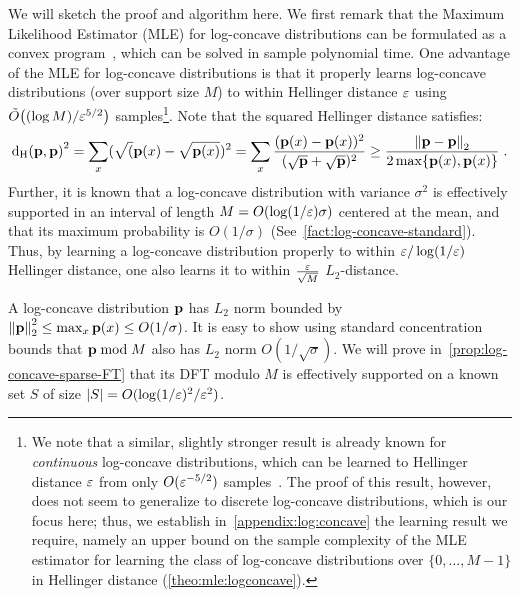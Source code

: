 We will sketch the proof and algorithm here. We first remark that the Maximum Likelihood Estimator (MLE) for log-concave distributions can be formulated as a convex program~\cite{DR:11}, 
which can be solved in sample polynomial time. One advantage of the MLE for log-concave distributions is that it properly learns log-concave distributions (over support size $M$) 
to within Hellinger distance $\varepsilon$ using $\tildeO{(\log M)/\eps^{5/2}}$ samples\footnote{We note that a similar, slightly stronger result is already known for \emph{continuous} log-concave distributions, which can be learned to Hellinger distance $\varepsilon$ from only $O(\varepsilon^{-5/2})$ samples~\cite{KS:16}. The proof of this result, however, does not seem to generalize to discrete log-concave distributions, which is our focus here; thus, we establish in~\cref{appendix:log:concave} the learning result we require, namely an upper bound on the sample complexity of the MLE estimator for learning the class of log-concave distributions over $\{0,\dots,M-1\}$ in Hellinger distance (\cref{theo:mle:logconcave}).}. Note that the squared Hellinger distance satisfies:
\[
{\operatorname{d_{\textrm{H}}}\!\left({\mathbf{p}, \mathbf{p}}\right)}^2 = \sum_x (\sqrt(\mathbf{p}(x)-\sqrt{\mathbf{p}(x)})^2 = \sum_x \frac{(\mathbf{p}(x)-\mathbf{p}(x))^2}{(\sqrt{\mathbf{p}} +\sqrt{\mathbf{p}})^2} \geq \frac{{\lVert\mathbf{p}-\mathbf{p}{\rVert}}_2}{2\max\{\mathbf{p}(x),\mathbf{p}(x)\}} \;.
\]
Further, it is known that a log-concave distribution with variance $\sigma^2$ is effectively supported in an interval of length $M=O(\log(1/\varepsilon) \sigma)$ centered at the mean, 
and that its maximum probability is $O(1/\sigma)$ (See~\cref{fact:log-concave-standard}). Thus, by learning a log-concave distribution properly to within $\varepsilon/\log(1/\varepsilon)$ Hellinger distance, one also learns it to within $\frac{\varepsilon}{\sqrt{M}}$ $L_2$-distance.

A log-concave distribution $\mathbf{p}$ has $L_2$ norm bounded by ${\lVert\mathbf{p}{\rVert}}_2^2 \leq \max_x \mathbf{p}(x) \leq O(1/\sigma)$. 
It is easy to show using standard concentration bounds that $\mathbf{p} \bmod M$ also has $L_2$ norm $O(1/\sqrt{\sigma})$. 
We will prove in~\cref{prop:log-concave-sparse-FT} that its DFT modulo $M$ is effectively 
supported on a known set $S$ of size $|S|=O(\log(1/\varepsilon)^2/\varepsilon^2)$.

